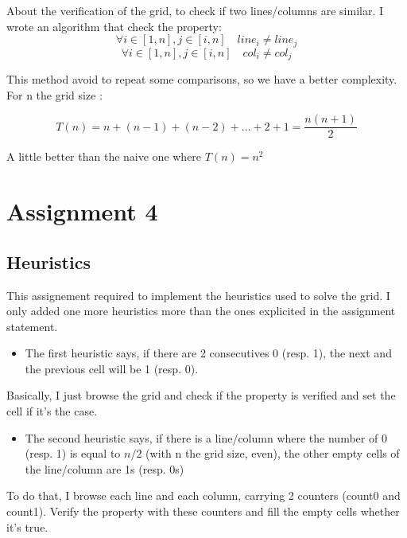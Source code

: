 \documentclass[a4paper,12pt]{article}
\begin{document}
About the verification of the grid, to check if two lines/columns are similar.
I wrote an algorithm that check the property:
\begin{equation}
    \forall i \in [1,n], j \in [i, n] \quad line_i \neq line_j 
\end{equation}
\begin{equation}
    \forall i \in [1,n], j \in [i, n] \quad col_i \neq col_j 
\end{equation}

This method avoid to repeat some comparisons, so we have a better complexity. For n the grid size :

\begin{equation}
    T(n) = n + (n-1) + (n-2)+ \dots + 2 + 1 = \frac{n(n+1)}{2}
\end{equation}

A little better than the naive one where $T(n) = n^2$

\section{Assignment 4}

\subsection{Heuristics}

This assignement required to implement the heuristics used to solve the grid.
I only added one more heuristics more than the ones explicited in the assignment statement.
\begin{itemize}
    \item The first heuristic says, if there are 2 consecutives 0 (resp. 1), the next and the previous cell will be 1 (resp. 0).
\end{itemize}

Basically, I just browse the grid and check if the property is verified and set the cell if it's the case.

\begin{itemize}
    \item  The second heuristic says, 
    if there is a line/column where the number of 0 (resp. 1) 
    is equal to $n/2$ (with n the grid size, even), the other empty cells of the line/column are 1s (resp. 0s)
\end{itemize}

To do that, I browse each line and each column, carrying 2 counters (count0 and count1). Verify the property with these counters and fill the empty cells whether it's true.
\end{document}
